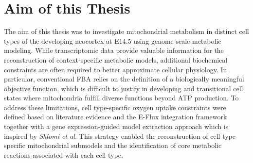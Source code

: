 \chapter{Aim of this Thesis}
\label{chap:aim}
The aim of this thesis was to investigate mitochondrial metabolism in distinct cell types of the developing neocortex at E14.5 using genome-scale metabolic modeling. While transcriptomic data provide valuable information for the reconstruction of context-specific metabolic models, additional biochemical constraints are often required to better approximate cellular physiology. In particular, conventional FBA relies on the definition of a biologically meaningful objective function, which is difficult to justify in developing and transitional cell states where mitochondria fulfill diverse functions beyond ATP production. To address these limitations, cell type-specific oxygen uptake constraints were defined based on literature evidence and the E-Flux integration framework together with a gene expression-guided model extraction approach which is inspired by \textit{Shlomi et al.}
This strategy enabled the reconstruction of cell type-specific mitochondrial submodels and the identification of core metabolic reactions associated with each cell type. 


\endinput 